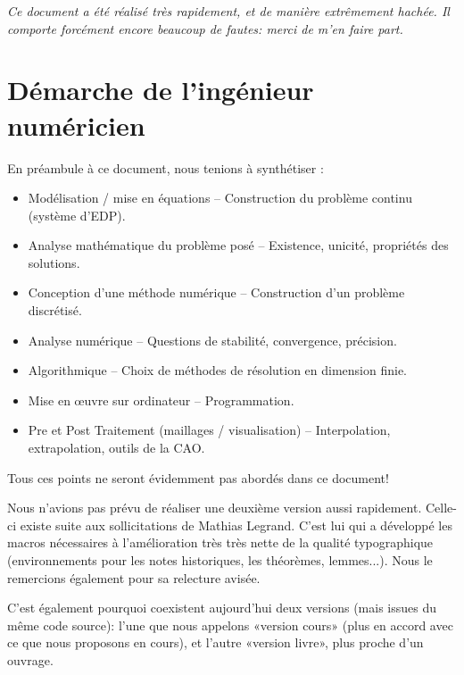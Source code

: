 \documentclass[11pt,pdflatex]{book}
\begin{document}
\medskip
\emph{Ce document a été réalisé très rapidement, et de manière extrêmement hachée. Il comporte forcément encore beaucoup de fautes: merci de m'en faire part.}




\bigskip
\section*{Démarche de l'ingénieur numéricien}

En préambule à ce document, nous tenions à synthétiser :
\begin{itemize}
   \item Modélisation / mise en équations -- Construction du problème continu (système d'EDP).
   \item Analyse mathématique du problème posé -- Existence, unicité, propriétés des solutions.
   \item Conception d'une méthode numérique -- Construction d'un problème discrétisé.
   \item Analyse numérique -- Questions de stabilité, convergence, précision.
   \item Algorithmique -- Choix de méthodes de résolution en dimension finie.
   \item Mise en œuvre sur ordinateur -- Programmation.
   \item Pre et Post Traitement (maillages / visualisation) -- Interpolation, extrapolation, outils de la CAO.
\end{itemize}

\medskip
Tous ces points ne seront évidemment pas abordés dans ce document!
\vfill
\noindent
{}

Nous n'avions pas prévu de réaliser une deuxième version aussi rapidement.
Celle-ci existe suite aux sollicitations de Mathias Legrand. C'est lui  qui a développé les macros nécessaires à l'amélioration très très nette de la qualité typographique (environnements pour les notes historiques, les théorèmes, lemmes...). Nous le remercions également pour sa relecture avisée.

C'est également pourquoi coexistent aujourd'hui deux versions (mais issues du même code source): l'une que nous appelons «version cours» (plus en accord avec ce que nous proposons en cours), et l'autre «version livre», plus proche d'un ouvrage.
\end{document}
